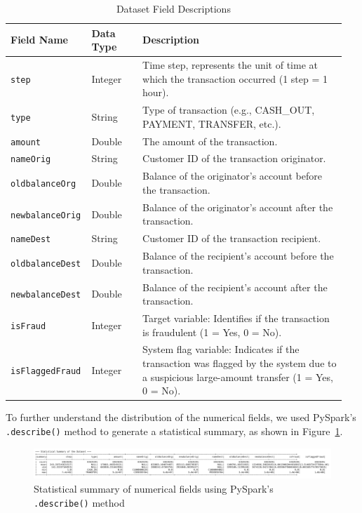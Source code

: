 \documentclass[sigplan,screen]{acmart}
\begin{document}
\begin{table}[h]
\caption{Dataset Field Descriptions}
\label{tab:data-fields}
\small
\begin{tabular}{|p{0.20\linewidth}|p{0.15\linewidth}|p{0.60\linewidth}|}
\hline
\textbf{Field Name} & \textbf{Data Type} & \textbf{Description} \\
\hline
\texttt{step} & Integer & Time step, represents the unit of time at which the transaction occurred (1 step = 1 hour). \\
\hline
\texttt{type} & String & Type of transaction (e.g., CASH\_OUT, PAYMENT, TRANSFER, etc.). \\
\hline
\texttt{amount} & Double & The amount of the transaction. \\
\hline
\texttt{nameOrig} & String & Customer ID of the transaction originator. \\
\hline
\texttt{old\-balance\-Org} & Double & Balance of the originator's account before the transaction. \\
\hline
\texttt{new\-balance\-Orig} & Double & Balance of the originator's account after the transaction. \\
\hline
\texttt{nameDest} & String & Customer ID of the transaction recipient. \\
\hline
\texttt{old\-balance\-Dest} & Double & Balance of the recipient's account before the transaction. \\
\hline
\texttt{new\-balance\-Dest} & Double & Balance of the recipient's account after the transaction. \\
\hline
\texttt{isFraud} & Integer & Target variable: Identifies if the transaction is fraudulent (1 = Yes, 0 = No). \\
\hline
\texttt{is\-Flagged\-Fraud} & Integer & System flag variable: Indicates if the transaction was flagged by the system due to a suspicious large-amount transfer (1 = Yes, 0 = No). \\
\hline
\end{tabular}
\end{table}

To further understand the distribution of the numerical fields, we used PySpark's \texttt{.describe()} method to generate a statistical summary, as shown in Figure~\ref{fig:statistical-summary}.

\begin{figure}[h]
  \centering
  \includegraphics[width=\textwidth]{Figure/2.2.png}
  \caption{Statistical summary of numerical fields using PySpark's \texttt{.describe()} method}
  \label{fig:statistical-summary}
\end{figure}
\end{document}
